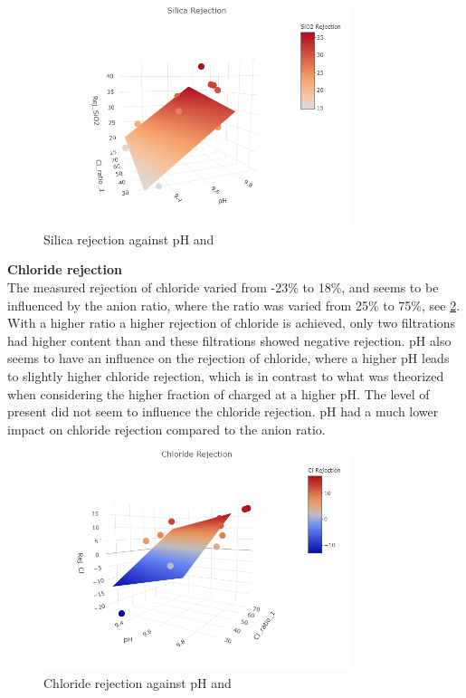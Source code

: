 \begin{figure}[H]
    \centering
    \includegraphics[width=0.8\textwidth]{Billeder/data/SPRR/Silica_rejection_3D.png}
    \caption{Silica rejection against pH and }
    \label{fig:Silica_rejection_3D}
\end{figure}


\textbf{Chloride rejection }\\

The measured rejection of chloride varied from -23\% to 18\%, and seems to be influenced by the anion ratio, where the  ratio was varied from 25\% to 75\%, see \cref{fig:Chloride_rejection_3D}. 
With a higher  ratio a higher rejection of chloride is achieved, only two filtrations had higher  content than  and these filtrations showed negative  rejection. 
pH also seems to have an influence on the rejection of chloride, where a higher pH leads to slightly higher chloride rejection, which is in contrast to what was theorized when considering the higher fraction of charged  at a higher pH. 
The level of  present did not seem to influence the chloride rejection.
pH had a much lower impact on chloride rejection compared to the anion ratio. 


\begin{figure}[H]
    \centering
    \includegraphics[width=0.8\textwidth]{Billeder/data/SPRR/Chlorid_rejection_3D.png}
    \caption{Chloride rejection against pH and }
    \label{fig:Chloride_rejection_3D}
\end{figure}

